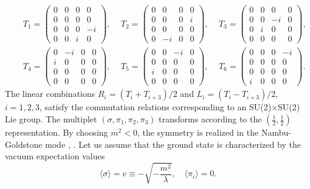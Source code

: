 \documentclass[twoside,12pt]{article}
\begin{document}
\begin{eqnarray*}
&&T_1=\left(\begin{array}{rrrr}0&0&0&0\\0&0&0&0\\0&0&0&-i\\0&0&i&0
\end{array}\right),\quad\,
T_2=\left(\begin{array}{rrrr}0&0&0&0\\0&0&0&i\\0&0&0&0\\0&-i&0&0
\end{array}\right),\quad\,
T_3=\left(\begin{array}{rrrr}0&0&0&0\\0&0&-i&0\\0&i&0&0\\0&0&0&0
\end{array}\right),\\
&&T_4=\left(\begin{array}{rrrr}0&-i&0&0\\i&0&0&0\\0&0&0&0\\0&0&0&0
\end{array}\right),\quad\,
T_5=\left(\begin{array}{rrrr}0&0&-i&0\\0&0&0&0\\i&0&0&0\\0&0&0&0
\end{array}\right),\quad\,
T_6=\left(\begin{array}{rrrr}0&0&0&-i\\0&0&0&0\\0&0&0&0\\i&0&0&0
\end{array}\right).
\end{eqnarray*}
   The linear combinations $R_i=(T_i+T_{i+3})/2$ and $L_i=(T_i-T_{i+3})/2$, $i=1,2,3$,
satisfy the commutation relations corresponding to an SU(2)$\times$SU(2) Lie group.
The  multiplet $(\sigma,\pi_1,\pi_2,\pi_3)$ transforms according to the $(\frac{1}{2},\frac{1}{2})$
representation.
   By choosing $m^2<0$, the symmetry is realized in
the Nambu-Goldstone mode \cite{Nambu:xd:1:1}, \cite{Goldstone:eq:1:1}.
   Let us assume that the ground state is characterized by the vacuum expectation values
\begin{equation}
\label{2:2:1:groundstate}
\langle \sigma\rangle = v\equiv -\sqrt{-\frac{m^2}{\lambda}},\quad \langle\pi_i\rangle=0.
\end{equation}
\end{document}
